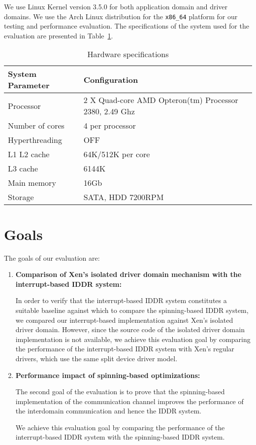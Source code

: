 We use Linux Kernel version 3.5.0 for both application domain and driver
domains. We use the Arch Linux distribution for the \texttt{x86\_64}
platform for our testing and performance evaluation. The specifications of
the system used for the evaluation are presented in Table~\ref{tab:config}.

\begin{table}
\caption{Hardware specifications}
\begin{center}
\begin{tabular}{ll}
  \hline
  \label{tab:config}
  System Parameter & Configuration \\
  \hline
  Processor & 2 X Quad-core AMD Opteron(tm) Processor 2380, 2.49 Ghz \\
  Number of cores & 4 per processor \\
  Hyperthreading & OFF \\
  L1 L2 cache & 64K/512K per core \\
  L3 cache & 6144K \\
  Main memory & 16Gb \\
  Storage & SATA, HDD 7200RPM \\
  \hline 
\end{tabular}
\end{center}
\end{table}

\section{Goals}
\label{sec:goals}
The goals of our evaluation are:
\begin{enumerate}
\item \textbf{Comparison  of Xen's isolated driver domain mechanism with the interrupt-based IDDR system:}

In order to verify that the interrupt-based IDDR system constitutes a suitable baseline against 
which to compare the spinning-based IDDR system, we compared our interrupt-based implementation
against Xen's isolated driver domain.  However, since the source code
of the isolated driver domain implementation is not available, we achieve this evaluation goal 
by comparing the performance of the interrupt-based IDDR system with Xen's regular
drivers, which use the same split device driver model.

\item \textbf{Performance impact of spinning-based optimizations:}

The second goal of the evaluation is to prove that the spinning-based implementation of the 
communication channel improves the performance of the interdomain communication and hence the IDDR system.

We achieve this evaluation goal by comparing the performance of the interrupt-based IDDR system 
with the spinning-based IDDR system.
\end{enumerate}


